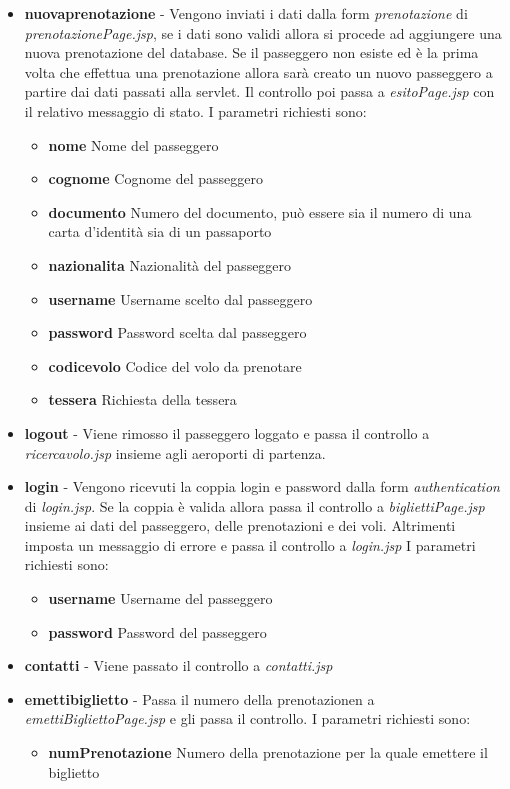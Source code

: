 \documentclass[a4paper,10pt]{article}
\begin{document}
\begin{itemize}
 \item \textbf{nuovaprenotazione} - Vengono inviati i dati dalla form \textit{prenotazione} di \textit{prenotazionePage.jsp}, se i dati sono validi allora si procede 
				     ad aggiungere una nuova prenotazione del database. Se il passeggero non esiste ed \`e la prima volta che effettua una prenotazione
				     allora sar\`a creato un nuovo passeggero a partire dai dati passati alla servlet. Il controllo poi passa a \textit{esitoPage.jsp} con 
				     il relativo messaggio di stato.
				     I parametri richiesti sono:
				     \begin{itemize}
				      \item \textbf{nome} Nome del passeggero
				      \item \textbf{cognome} Cognome del passeggero
				      \item \textbf{documento} Numero del documento, pu\`o essere sia il numero di una carta d'identit\`a sia di un passaporto
				      \item \textbf{nazionalita} Nazionalit\`a del passeggero
				      \item \textbf{username} Username scelto dal passeggero
				      \item \textbf{password} Password scelta dal passeggero
				      \item \textbf{codicevolo} Codice del volo da prenotare
				      \item \textbf{tessera} Richiesta della tessera
				     \end{itemize}

 \item \textbf{logout} - Viene rimosso il passeggero loggato e passa il controllo a \textit{ricercavolo.jsp} insieme agli aeroporti di partenza.
 \item \textbf{login} - Vengono ricevuti la coppia login e password dalla form \textit{authentication} di \textit{login.jsp}. Se la coppia \`e valida allora passa il controllo
			 a \textit{bigliettiPage.jsp} insieme ai dati del passeggero, delle prenotazioni e dei voli. Altrimenti imposta un messaggio di errore e passa il controllo
			 a \textit{login.jsp}
			 I parametri richiesti sono:
			 \begin{itemize}
			  \item \textbf{username} Username del passeggero
			  \item \textbf{password} Password del passeggero
			 \end{itemize}

 \item \textbf{contatti} - Viene passato il controllo a \textit{contatti.jsp}
 \item \textbf{emettibiglietto} - Passa il numero della prenotazionen a \textit{emettiBigliettoPage.jsp} e gli passa il controllo. 
				  I parametri richiesti sono:
				   \begin{itemize}
				    \item \textbf{numPrenotazione} Numero della prenotazione per la quale emettere il biglietto
				   \end{itemize}


\end{itemize}
\end{document}
